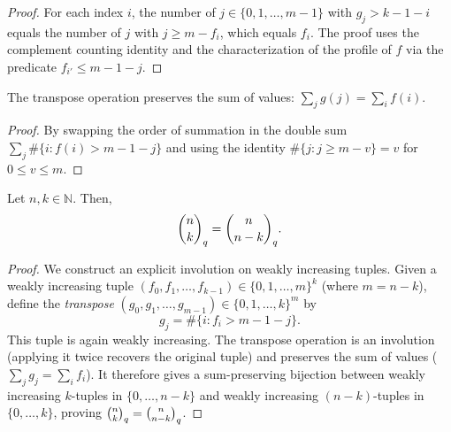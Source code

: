 \begin{proof}
For each index $i$, the number of $j \in \{0,1,\ldots,m{-}1\}$ with $g_j > k{-}1{-}i$ equals
the number of $j$ with $j \ge m - f_i$, which equals $f_i$.
The proof uses the complement counting identity and the characterization of the profile
of $f$ via the predicate $f_{i'} \le m{-}1{-}j$.
\end{proof}

\begin{lemma}
\label{lem.pars.qbinom.transpose-sum-preserved}
\leanhelper
\leanok
The transpose operation preserves the sum of values:
$\sum_{j} g(j) = \sum_{i} f(i)$.
\end{lemma}

\begin{proof}
By swapping the order of summation in the double sum
$\sum_j \#\{i : f(i) > m{-}1{-}j\}$ and using the identity
$\#\{j : j \ge m - v\} = v$ for $0 \le v \le m$.
\end{proof}

\begin{proposition}
\label{prop.pars.qbinom.symm}
\leantarget
\leanok
Let $n,k\in\mathbb{N}$. Then,
\[
\dbinom{n}{k}_{q}=\dbinom{n}{n-k}_{q}.
\]
\end{proposition}

\begin{proof}
\leanok
We construct an explicit involution on weakly increasing tuples. Given a weakly increasing
tuple $(f_0, f_1, \ldots, f_{k-1}) \in \{0,1,\ldots,m\}^k$ (where $m = n-k$),
define the \emph{transpose} $(g_0, g_1, \ldots, g_{m-1}) \in \{0,1,\ldots,k\}^m$ by
\[
g_j = \#\{i : f_i > m - 1 - j\}.
\]
This tuple is again weakly increasing. The transpose operation is an involution
(applying it twice recovers the original tuple) and preserves the sum of values
($\sum_j g_j = \sum_i f_i$). It therefore gives a sum-preserving
bijection between weakly increasing $k$-tuples in $\{0,\ldots,n{-}k\}$ and
weakly increasing $(n{-}k)$-tuples in $\{0,\ldots,k\}$, proving
$\dbinom{n}{k}_q = \dbinom{n}{n-k}_q$.
\end{proof}
